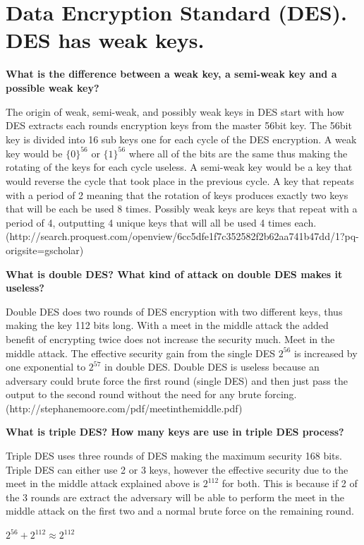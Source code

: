 \documentclass[letterpaper,11pt,notitlepage,fleqn]{article}
\begin{document}
\section{Data Encryption Standard (DES). DES has weak keys.}
\noindent \textbf{What is the difference between a weak key, a semi-weak key and a possible weak key?}

The origin of weak, semi-weak, and possibly weak keys in DES start with how DES extracts each rounds encryption keys from the master 56bit key. The 56bit key is divided into 16 sub keys one for each cycle of the DES encryption. A weak key would be $\lbrace0\rbrace^{56}$ or $\lbrace1\rbrace^{56}$ where all of the bits are the same thus making the rotating of the keys for each cycle useless. A semi-weak key would be a key that would reverse the cycle that took place in the previous cycle. A
key that repeats with a period of 2 meaning that the rotation of keys produces exactly two keys that will be each be used 8 times. Possibly weak keys are keys that repeat with a period of 4, outputting 4 unique keys that will all be used 4 times each. (http://search.proquest.com/openview/6cc5dfe1f7c352582f2b62aa741b47dd/1?pq-origsite=gscholar) 

\noindent \textbf{What is double DES?  What kind of attack on double DES makes it useless?}

Double DES does two rounds of DES encryption with two different keys, thus making the key 112 bits long. With a meet in the middle attack the added benefit of encrypting twice does not increase the security much. 
Meet in the middle attack. The effective security gain from the single DES $2^{56}$ is increased by one exponential to $2^{57}$ in double DES. Double DES is useless because an adversary could brute force the first round (single DES) and then just pass the output to the second round without the need for any brute forcing. (http://stephanemoore.com/pdf/meetinthemiddle.pdf)

\noindent \textbf{What is triple DES?  How many keys are use in triple DES process?}

Triple DES uses three rounds of DES making the maximum security 168 bits. Triple DES can either use 2 or 3 keys, however the effective security due to the meet in the middle attack explained above is $2^{112}$ for both. This is because if 2 of the 3 rounds are extract the adversary will be able to perform the meet in the middle attack on the first two and a normal brute force on the remaining round. \\
\begin{center}
    $2^{56} + 2^{112} \approx 2^{112}$
\end{center}
\end{document}

